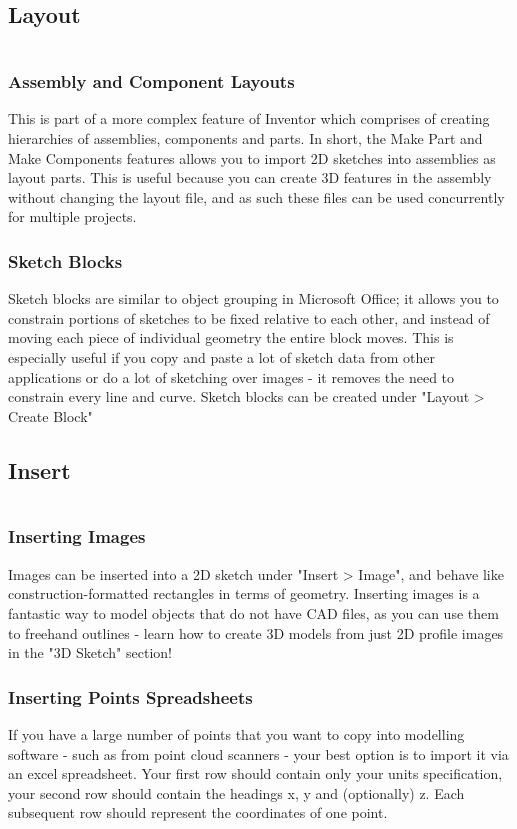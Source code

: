\begin{enumerate}
\subsection{Layout}

$ $

\subsubsection{Assembly and Component Layouts}
This is part of a more complex feature of Inventor which comprises of creating hierarchies of assemblies, components and parts. In short, the Make Part and Make Components features allows you to import 2D sketches into assemblies as layout parts. This is useful because you can create 3D features in the assembly without changing the layout file, and as such these files can be used concurrently for multiple projects.

\subsubsection{Sketch Blocks}
Sketch blocks are similar to object grouping in Microsoft Office; it allows you to constrain portions of sketches to be fixed relative to each other, and instead of moving each piece of individual geometry the entire block moves. This is especially useful if you copy and paste a lot of sketch data from other applications or do a lot of sketching over images - it removes the need to constrain every line and curve. Sketch blocks can be created under "Layout > Create Block"

\subsection{Insert}

$ $

\subsubsection{Inserting Images}
Images can be inserted into a 2D sketch under "Insert > Image", and behave like construction-formatted rectangles in terms of geometry. Inserting images is a fantastic way to model objects that do not have CAD files, as you can use them to freehand outlines - learn how to create 3D models from just 2D profile images in the "3D Sketch" section!

\subsubsection{Inserting Points Spreadsheets}
If you have a large number of points that you want to copy into modelling software - such as from point cloud scanners - your best option is to import it via an excel spreadsheet. Your first row should contain only your units specification, your second row should contain the headings x, y and (optionally) z. Each subsequent row should represent the coordinates of one point.


\end{enumerate}
